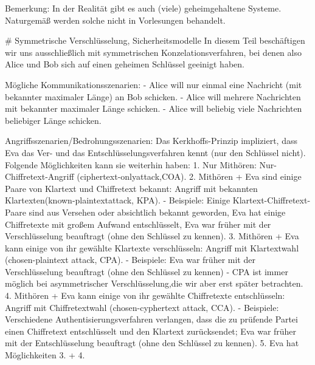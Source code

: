 \documentclass[a4paper]{article}
\begin{document}
\begin{multicols}{3}
Bemerkung: In der Realität gibt es auch (viele) geheimgehaltene Systeme. Naturgemäß werden solche nicht in Vorlesungen behandelt.

# Symmetrische Verschlüsselung, Sicherheitsmodelle
In diesem Teil beschäftigen wir uns ausschließlich mit symmetrischen Konzelationsverfahren, bei denen also Alice und Bob sich auf einen geheimen Schlüssel geeinigt haben.

Mögliche Kommunikationsszenarien:
- Alice will nur einmal eine Nachricht (mit bekannter maximaler Länge) an Bob schicken.
- Alice will mehrere Nachrichten mit bekannter maximaler Länge schicken.
- Alice will beliebig viele Nachrichten beliebiger Länge schicken.

Angriffsszenarien/Bedrohungsszenarien: 
Das Kerkhoffs-Prinzip impliziert, dass Eva das Ver- und das Entschlüsselungsverfahren kennt (nur den Schlüssel nicht). Folgende Möglichkeiten kann sie weiterhin haben:
1. Nur Mithören: Nur-Chiffretext-Angriff (ciphertext-onlyattack,COA).
2. Mithören + Eva sind einige Paare von Klartext und Chiffretext bekannt: Angriff mit bekannten Klartexten(known-plaintextattack, KPA). 
    - Beispiele: Einige Klartext-Chiffretext-Paare sind aus Versehen oder absichtlich bekannt geworden, Eva hat einige Chiffretexte mit großem Aufwand entschlüsselt, Eva war früher mit der Verschlüsselung beauftragt (ohne den Schlüssel zu kennen).
3. Mithören + Eva kann einige von ihr gewählte Klartexte verschlüsseln: Angriff mit Klartextwahl (chosen-plaintext attack, CPA). 
   - Beispiele: Eva war früher mit der Verschlüsselung beauftragt (ohne den Schlüssel zu kennen)
   - CPA ist immer möglich bei asymmetrischer Verschlüsselung,die wir aber erst später betrachten.
4. Mithören + Eva kann einige von ihr gewählte Chiffretexte entschlüsseln: Angriff mit Chiffretextwahl (chosen-cyphertext attack, CCA).
    - Beispiele: Verschiedene Authentisierungsverfahren verlangen, dass die zu prüfende Partei einen Chiffretext entschlüsselt und den Klartext zurücksendet; Eva war früher mit der Entschlüsselung beauftragt (ohne den Schlüssel zu kennen).
5. Eva hat Möglichkeiten 3. + 4.


\end{multicols}
\end{document}

